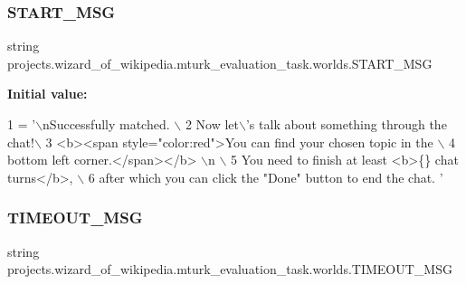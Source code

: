 \subsubsection{\texorpdfstring{S\+T\+A\+R\+T\+\_\+\+M\+SG}{START\_MSG}}
{\footnotesize\ttfamily string projects.\+wizard\+\_\+of\+\_\+wikipedia.\+mturk\+\_\+evaluation\+\_\+task.\+worlds.\+S\+T\+A\+R\+T\+\_\+\+M\+SG}

{\bfseries Initial value\+:}
\begin{DoxyCode}
1 =  \textcolor{stringliteral}{'\(\backslash\)nSuccessfully matched. \(\backslash\)}
2 \textcolor{stringliteral}{        Now let\(\backslash\)'s talk about something through the chat!\(\backslash\)}
3 \textcolor{stringliteral}{        <b><span style="color:red">You can find your chosen topic in the \(\backslash\)}
4 \textcolor{stringliteral}{        bottom left corner.</span></b> \(\backslash\)n \(\backslash\)}
5 \textcolor{stringliteral}{        You need to finish at least <b>\{\} chat turns</b>, \(\backslash\)}
6 \textcolor{stringliteral}{        after which you can click the "Done" button to end the chat. '}
\end{DoxyCode}
\mbox{\label{namespaceprojects_1_1wizard__of__wikipedia_1_1mturk__evaluation__task_1_1worlds_a76bbbf9d2a8f67f0e0c0c963d004e098}} 
\subsubsection{\texorpdfstring{T\+I\+M\+E\+O\+U\+T\+\_\+\+M\+SG}{TIMEOUT\_MSG}}
{\footnotesize\ttfamily string projects.\+wizard\+\_\+of\+\_\+wikipedia.\+mturk\+\_\+evaluation\+\_\+task.\+worlds.\+T\+I\+M\+E\+O\+U\+T\+\_\+\+M\+SG}

